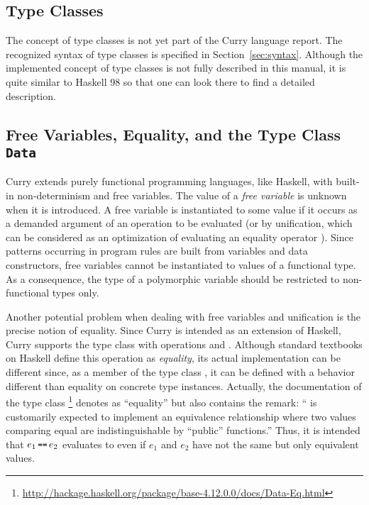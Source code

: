 \subsection{Type Classes}

The concept of type classes is not yet part of the Curry language report.
The recognized syntax of type classes is specified in
Section~\ref{sec:syntax}.
Although the implemented concept of type classes
is not fully described in this manual,
it is quite similar to Haskell 98 \cite{PeytonJones03Haskell}
so that one can look there to find a detailed description.


\subsection{Free Variables, Equality, and the Type Class \texttt{Data}}
\label{sec:free-data}

Curry extends purely functional programming languages, like Haskell,
with built-in non-determinism and free variables.
The value of a \emph{free variable}
is unknown when it is introduced.
A free variable is instantiated to some value if it occurs
as a demanded argument of an operation to be evaluated
(or by unification, which can be considered
as an optimization of evaluating an equality operator \cite{AntoyHanus17FAoC}).
Since patterns occurring in program rules are built from
variables and data constructors, free variables cannot be
instantiated to values of a functional type.
As a consequence, the type of a polymorphic variable
should be restricted to non-functional types only.

Another potential problem when dealing with free variables
and unification is the precise notion of equality.
Since Curry is intended as an extension of Haskell,
Curry supports the type class  with operations
\ccode{==} and \ccode{/=}.
Although standard textbooks on Haskell define this operation
as \emph{equality},
its actual implementation can be different since, as a member of the
type class , it can be defined with a behavior
different than equality on concrete type instances.
Actually, the documentation of the type class \footnote{%
\url{http://hackage.haskell.org/package/base-4.12.0.0/docs/Data-Eq.html}}
denotes \ccode{==} as ``equality'' but also contains the remark:
``\code{==} is customarily expected to implement an equivalence
relationship where two values comparing equal are indistinguishable
by ``public'' functions.''
Thus, it is intended that $e_1 \seq e_2$ evaluates to 
even if $e_1$ and $e_2$ have not the same but only equivalent values.

